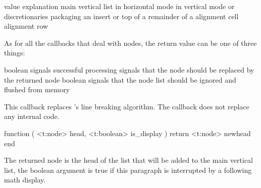 \starttabulate[|l|p|]
\FL
\BC value                \BC explanation                                     \NC \NR
\ML
\NC {}       \NC main vertical list                              \NC \NR
\NC {}          \NC \type {\hbox} in horizontal mode                \NC \NR
\NC {} \NC \type {\hbox} in vertical mode                  \NC \NR
\NC {}          \NC \type {\vbox}                                   \NC \NR
\NC {}          \NC \type {\vtop}                                   \NC \NR
\NC {}         \NC \type {\halign} or \type {\valign}              \NC \NR
\NC {}          \NC discretionaries                                 \NC \NR
\NC {}        \NC packaging an insert                             \NC \NR
\NC {}       \NC \type {\vcenter}                                \NC \NR
\NC {}     \NC \type {\localleftbox} or \type {\localrightbox} \NC \NR
\NC {}     \NC top of a \type {\vsplit}                        \NC \NR
\NC {}    \NC remainder of a \type {\vsplit}                  \NC \NR
\NC {}     \NC alignment cell                                  \NC \NR
\NC {}       \NC alignment row                                   \NC \NR
\LL
\stoptabulate

As for all the callbacks that deal with nodes, the return value can be one of
three things:

\startitemize
\startitem
    boolean  signals successful processing
\stopitem
\startitem
     signals that the  node should be replaced by the
    returned node
\stopitem
\startitem
    boolean  signals that the  node list should be
    ignored and flushed from memory
\stopitem
\stopitemize

\stopsubsection

\startsubsection[title=linebreak]

This callback replaces \LUATEX's line breaking algorithm. The callback does not
replace any internal code.

\starttyping[option=LUA]
function (
    <t:node>    head,
    <t:boolean> is_display
)
    return <t:node> newhead
end
\stoptyping

The returned node is the head of the list that will be added to the main vertical
list, the boolean argument is true if this paragraph is interrupted by a
following math display.


